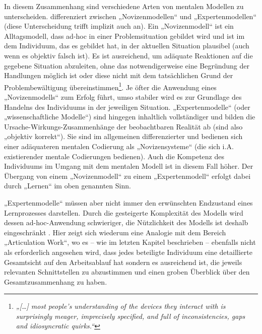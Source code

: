 In diesem Zusammenhang sind verschiedene Arten von mentalen Modellen zu unterscheiden. \citet{Seel91} differenziert zwischen „Novizenmodellen“ und „Expertenmodellen“ (diese Unterscheidung trifft implizit auch \citet{Norman83a} an). Ein „Novizenmodell“ ist ein Alltagsmodell, dass ad-hoc in einer Problemsituation gebildet wird und ist im dem Individuum, das es gebildet hat, in der aktuellen Situation plausibel (auch wenn es objektiv falsch ist). Es ist ausreichend, um adäquate Reaktionen auf die gegebene Situation abzuleiten, ohne das notwendigerweise eine Begründung der Handlungen möglich ist oder diese nicht mit dem tatsächlichen Grund der Problembewältigung übereinstimmen\footnote{\emph{„[\ldots] most people’s understanding of the devices they interact with is surprisingly meager, imprecisely specified, and full of inconsistencies, gaps and idiosyncratic quirks.“}\citep[][S. 8]{Norman83a}}. Je öfter die Anwendung eines „Novizenmodells“ zum Erfolg führt, umso stabiler wird es zur Grundlage des Handelns des Individuums in der jeweiligen Situation. „Expertenmodelle“ (oder „wissenschaftliche Modelle“) sind hingegen inhaltlich vollständiger und bilden die Ursache-Wirkungs-Zusammenhänge der beobachtbaren Realität ab (sind also „objektiv korrekt“). Sie sind im allgemeinen differenzierter und bedienen sich einer adäquateren mentalen Codierung als „Novizensysteme“ (die sich i.A. existierender mentale Codierungen bedienen). Auch die Kompetenz des Individuums im Umgang mit dem mentalen Modell ist in diesem Fall höher. Der Übergang von einem „Novizenmodell“ zu einem „Expertenmodell“ erfolgt dabei durch „Lernen“ im oben genannten Sinn. \citep{Ifenthaler06}

„Expertenmodelle“ müssen aber nicht immer den erwünschten Endzustand eines Lernprozesses darstellen. Durch die gesteigerte Komplexität des Modells wird dessen ad-hoc-Anwendung schwieriger, die Nützlichkeit des Modells ist deshalb eingeschränkt \citep[vgl. ][S. 20]{Ifenthaler06}. Hier zeigt sich wiederum eine Analogie mit dem Bereich „Articulation Work“, wo es -- wie im letzten Kapitel beschrieben -- ebenfalls nicht als erforderlich angesehen wird, dass jedes beteiligte Individuum eine detaillierte Gesamtsicht auf den Arbeitsablauf hat sondern es ausreichend ist, die jeweils relevanten Schnittstellen zu abzustimmen und einen groben Überblick über den Gesamtzusammenhang zu haben. 


